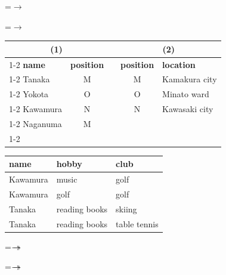 {\newpage
\clearpage
\samepage \setbox\sizebox=\hbox{$\rightarrow$}\box\sizebox
}

{\newpage
\clearpage
\samepage \setbox\sizebox=\hbox{$\rightarrow$}\box\sizebox
}

{\newpage
\clearpage
\samepage \begin{table}[ht]
\begin{center}
\label{t:tab2}
\begin{tabular}{|l|c|l|c|l|}
\multicolumn{2}{c}{(1)}&\multicolumn{1}{c}{}
	&\multicolumn{2}{c}{(2)}\\ \cline{1-2}\cline{4-5}
{\bf name}	&{\bf position}	&	&{\bf position}	&{\bf location}
\\ \cline{1-2}\cline{4-5}
Tanaka	&M	&	&M	&Kamakura city\\ \cline{1-2}\cline{4-5}
Yokota	&O	&	&O	&Minato ward\\ \cline{1-2}\cline{4-5}
Kawamura&N	&	&N	&Kawasaki city\\ \cline{1-2}\cline{4-5}
Naganuma&M\\ \cline{1-2}
\end{tabular}
\end{center}
\end{table}
}

{\newpage
\clearpage
\samepage \begin{table}[ht]
\begin{center}
\label{t:tab3}
\begin{tabular}{|l|l|l|}\hline
{\bf name}	&{\bf hobby}	&{\bf club}\\ \hline
Kawamura	&music		&golf\\ \hline
Kawamura	&golf		&golf\\ \hline
Tanaka		&reading books	&skiing\\ \hline
Tanaka		&reading books	&table tennis \\ \hline
\end{tabular}
\end{center}
\end{table}
}

{\newpage
\clearpage
\samepage \setbox\sizebox=\hbox{$\rightarrow\hspace{-3mm}\rightarrow$}\box\sizebox
}

{\newpage
\clearpage
\samepage \setbox\sizebox=\hbox{$\rightarrow\hspace{-3mm}\rightarrow$}\box\sizebox
}

